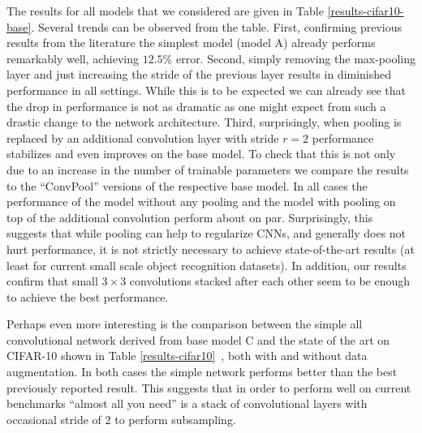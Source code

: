 \documentclass{article} \usepackage{iclr2015,times}
\begin{document}
The results for all models that we considered are given in Table \ref{results-cifar10-base}.
Several trends can be observed from the table. First, confirming
previous results from the literature \citep{Srivastava14a} the simplest
model (model A) already performs remarkably well, achieving $12.5 \%$
error. Second, simply removing the max-pooling layer and just increasing the
stride of the previous layer results in diminished performance in all
settings. While this is to be expected we can already see that the
drop in performance is not as dramatic as one might expect from such a
drastic change to the network architecture.
Third, surprisingly, when pooling is replaced by an additional convolution layer
with stride $r = 2$ performance stabilizes and even improves on the
base model. To check that this is not only due to
an increase in the number of trainable parameters we compare the results to the \mbox{``ConvPool''}
versions of the respective base model. In all cases the performance of
the model without any pooling and the model with pooling on top of the
additional convolution perform about on par. Surprisingly, this suggests that while
pooling can help to regularize CNNs, and generally does not hurt
performance, it is not strictly necessary to achieve state-of-the-art
results (at least for current small scale object recognition
datasets). In addition, our results confirm that small $3\times3$
convolutions stacked after each other seem to be enough to achieve the
best performance.

Perhaps even more interesting is the comparison between the simple all
convolutional network derived from base model C and the state of the art on CIFAR-10 shown in Table
\ref{results-cifar10}~, both with and without data augmentation. In both
cases the simple network performs better than the best previously
reported result.
This suggests that in order to perform well on
current benchmarks ``almost all you need'' is a stack of convolutional
layers with occasional stride of $2$ to perform subsampling. 
\end{document}
